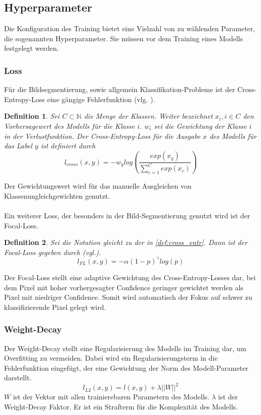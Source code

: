 \documentclass[12pt,DIV=15,BCOR=15mm,twoside,headsepline,abstract=true,listof=totoc,bibliography=totoc]{scrreprt}
\newtheorem{defi}{Definition}
\theoremstyle{remark}    %
\begin{document}
    \subsection{Hyperparameter}
    Die Konfiguration des Training bietet eine Vielzahl von zu wählenden Parameter, die sogenannten Hyperparameter. Sie müssen vor dem Training eines 
    Modells festgelegt werden.
    \subsubsection{Loss}
    Für die Bildsegmentierung, sowie allgemein Klassifikation-Probleme ist der Cross-Entropy-Loss eine gängige Fehlerfunktion 
    (vlg. \cite{chen2017rethinkingatrousconvolutionsemantic,csurka2023semanticimagesegmentationdecades}).
    \begin{defi}
    Sei $C \subset \mathbb{N}$ die Menge der Klassen. Weiter bezeichnet $x_i, i \in C$ den Vorhersagewert des Modells für die Klasse $i$.
    $w_i$ sei die Gewichtung der Klasse $i$ in der Verlustfunktion. Der Cross-Entropy-Loss für die Ausgabe $x$ des Modells für das Label $y$ ist definiert 
    durch
    \begin{equation}\label{def:cross_entr}
        l_{cross}(x,y) = -w_{y} log\left(\frac{exp(x_{y})}{\sum_{c=1}^{C}exp(x_{c})}\right)
    \end{equation}
    \end{defi}\noindent
    Der Gewichtungswert wird für das manuelle Ausgleichen von Klassenungleichgewichten genutzt. \\\\
    Ein weiterer Loss, der besonders in der Bild-Segmentierung genutzt wird ist der Focal-Loss.
    \begin{defi}
    Sei die Notation gleicht zu der in \ref{def:cross_entr}. Dann ist der Focal-Loss gegeben durch (vgl.\cite{lin2018focallossdenseobject}). 
    \begin{equation}
        l_{FL}(x,y) = -\alpha (1-p)^{\gamma}log (p)
    \end{equation} 
    \end{defi}\noindent
    Der Focal-Loss stellt eine adaptive Gewichtung des Cross-Entropy-Losses dar, bei dem Pixel mit hoher vorhergesagter Confidence geringer gewichtet 
    werden als Pixel mit niedriger Confidence. Somit wird automatisch der Fokus auf schwer zu klassifizierende Pixel gelegt wird.
    \subsubsection{Weight-Decay}
    Der Weight-Decay stellt eine Regularisierung des Modells im Training dar, um Overfitting zu vermeiden. Dabei wird ein Regularisierungsterm in die
    Fehlerfunktion eingefügt, der eine Gewichtung der Norm des Modell-Parameter darstellt.  
    \begin{equation}
        l_{L2}(x,y) = l(x,y) + \lambda ||W||^2
    \end{equation}
    $W$ ist der Vektor mit allen trainierebaren Parametern des Modells. $\lambda$ ist der Weight-Decay Faktor. 
    Er ist ein Strafterm für die Komplexität des Modells.
\end{document}

